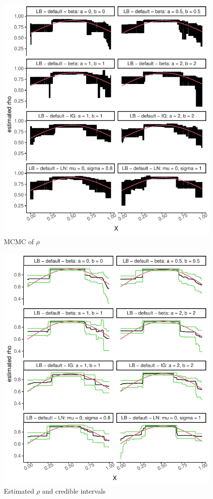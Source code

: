 \documentclass{amsart}
\begin{document}
\begin{figure}[ht]
	\centering
	\includegraphics[width=0.95\linewidth]{mcmc_rho_3.pdf}
	\caption{MCMC of $\rho$}
	\label{fig:mcmc:rho:3}
\end{figure}

\begin{figure}[ht]
	\centering
	\includegraphics[width=0.95\linewidth]{predicted_rho_3.pdf}
	\caption{Estimated $\rho$ and credible intervals}
	\label{fig:pred:rho:3}
\end{figure}
\end{document}
